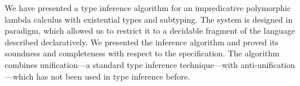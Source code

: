 We have presented a type inference algorithm for an impredicative polymorphic
lambda calculus with existential types and subtyping. The system is designed in
\CBPV paradigm, which allowed us to restrict it to a decidable fragment of the
language described declaratively. We presented the inference algorithm
and proved its soundness and completeness with respect to the specification. The
algorithm combines unification---a standard type inference technique---with
anti-unification---which has not been used in type inference before.
